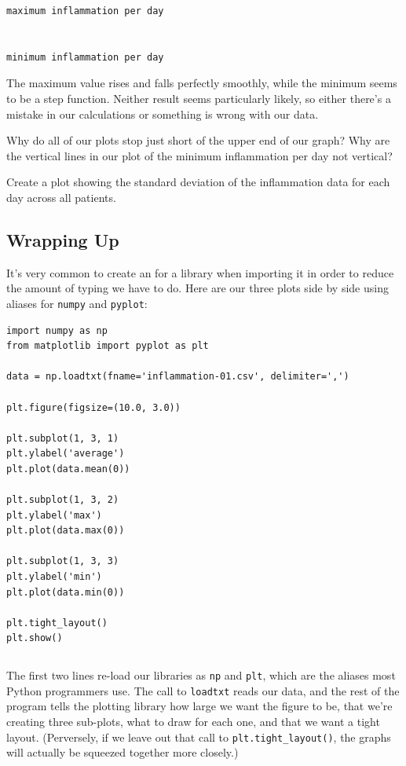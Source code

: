 \documentclass{book}
\begin{document}
\begin{verbatim}
maximum inflammation per day


minimum inflammation per day

\end{verbatim}

The maximum value rises and falls perfectly smoothly, while the minimum
seems to be a step function. Neither result seems particularly likely,
so either there's a mistake in our calculations or something is wrong
with our data.

\begin{challenge}
  Why do all of our plots stop just short of the upper end of our graph?
  Why are the vertical lines in our plot of the minimum inflammation per
  day not vertical?
\end{challenge}

\begin{challenge}
  Create a plot showing the standard deviation of the inflammation data
  for each day across all patients.
\end{challenge}

\subsection{Wrapping Up}

It's very common to create an  for a
library when importing it in order to reduce the amount of typing we
have to do. Here are our three plots side by side using aliases for
\texttt{numpy} and \texttt{pyplot}:

\begin{verbatim}
import numpy as np
from matplotlib import pyplot as plt

data = np.loadtxt(fname='inflammation-01.csv', delimiter=',')

plt.figure(figsize=(10.0, 3.0))

plt.subplot(1, 3, 1)
plt.ylabel('average')
plt.plot(data.mean(0))

plt.subplot(1, 3, 2)
plt.ylabel('max')
plt.plot(data.max(0))

plt.subplot(1, 3, 3)
plt.ylabel('min')
plt.plot(data.min(0))

plt.tight_layout()
plt.show()
\end{verbatim}

\begin{verbatim}
\end{verbatim}

The first two lines re-load our libraries as \texttt{np} and
\texttt{plt}, which are the aliases most Python programmers use. The
call to \texttt{loadtxt} reads our data, and the rest of the program
tells the plotting library how large we want the figure to be, that
we're creating three sub-plots, what to draw for each one, and that we
want a tight layout. (Perversely, if we leave out that call to
\texttt{plt.tight\_layout()}, the graphs will actually be squeezed
together more closely.)
\end{document}
